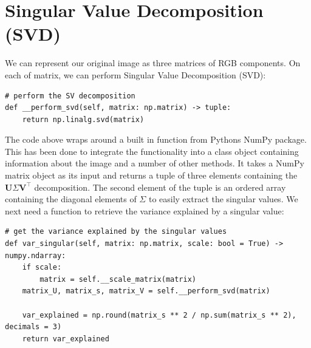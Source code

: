 \documentclass{article}
\begin{document}
	\section{Singular Value Decomposition (SVD)}
	We can represent our original image as three matrices of RGB components. On each of matrix, we can perform Singular Value Decomposition (SVD): 
	
	\begin{verbatim}
# perform the SV decomposition
def __perform_svd(self, matrix: np.matrix) -> tuple:
	return np.linalg.svd(matrix)
	\end{verbatim}

	The code above wraps around a built in function from Pythons NumPy package. This has been done to integrate the functionality into a class object containing information about the image and a number of other methods. It takes a NumPy matrix object as its input and returns a tuple of three elements containing the $\textbf{U}\Sigma\textbf{V}^{\top}$ decomposition. The second element of the tuple is an ordered array containing the diagonal elements of $\Sigma$ to easily extract the singular values. We next need a function to retrieve the variance explained by a singular value:
	
	\begin{verbatim}
# get the variance explained by the singular values
def var_singular(self, matrix: np.matrix, scale: bool = True) -> numpy.ndarray:
	if scale:
		matrix = self.__scale_matrix(matrix)
	matrix_U, matrix_s, matrix_V = self.__perform_svd(matrix)
	
	var_explained = np.round(matrix_s ** 2 / np.sum(matrix_s ** 2), decimals = 3)
	return var_explained
	\end{verbatim}
\end{document}
